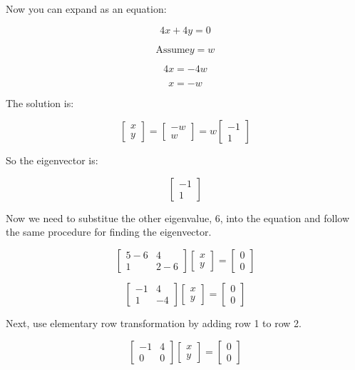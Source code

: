 Now you can expand as an equation:

$$4x + 4y = 0$$

$$ \text{Assume}  y = w$$

  $$4x = -4w$$

  $$x = -w$$

  The solution is:

$$\begin{bmatrix}
x\\
y 
\end{bmatrix} = 
\begin{bmatrix}
-w \\
w 
\end{bmatrix} = 
w\begin{bmatrix}
-1\\
1
\end{bmatrix}$$

So the eigenvector is:

$$\begin{bmatrix}
-1\\
1
\end{bmatrix}$$

Now we need to substitue the other eigenvalue, 6, into the equation and follow the same procedure for finding the eigenvector. 

$$\begin{bmatrix}
5-6 & 4\\
 1 & 2-6 
\end{bmatrix}
\begin{bmatrix}
x  \\
y 
\end{bmatrix} = 
\begin{bmatrix}
0  \\
0 
\end{bmatrix}$$

$$\begin{bmatrix}
-1 & 4\\
 1 & -4
\end{bmatrix}
\begin{bmatrix}
x  \\
y 
\end{bmatrix} = 
\begin{bmatrix}
0  \\
0 
\end{bmatrix}$$

Next, use elementary row transformation by adding row 1 to row 2.

$$\begin{bmatrix}
-1 & 4 \\
 0 & 0 
\end{bmatrix}
\begin{bmatrix}
x\\
y
\end{bmatrix} = 
\begin{bmatrix}
0\\
0 
\end{bmatrix}$$

